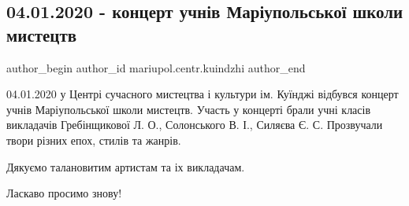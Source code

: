  
 
 
 
 

\subsection{04.01.2020 - концерт учнів Маріупольської школи мистецтв}
\label{sec:08_01_2020.fb.mariupol.centr.kuindzhi.2.04012020_koncert_uchniv_mariupol_shkoly_mystectv}

\ifcmt
 author_begin
   author_id mariupol.centr.kuindzhi
 author_end
\fi

04.01.2020 у Центрі сучасного мистецтва і культури ім. Куїнджі відбувся концерт
учнів Маріупольської школи мистецтв. Участь у концерті брали учні класів
викладачів Гребінщикової Л. О., Солонського В. І., Силяєва Є. С. Прозвучали
твори різних епох, стилів та жанрів.

Дякуємо талановитим артистам та іх викладачам.

Ласкаво просимо знову!
